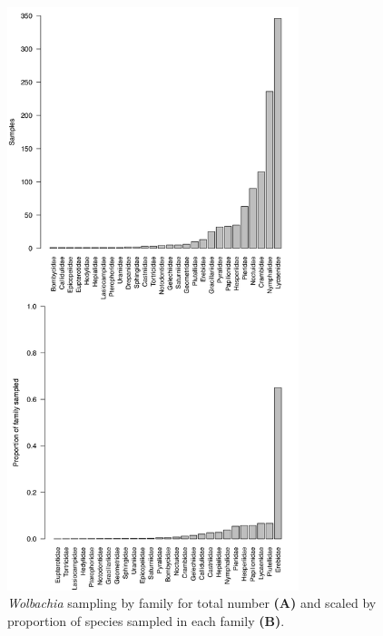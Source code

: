 \documentclass{frontiersSCNS}
\begin{document}
\begin{figure}[h!]
\begin{center}
\includegraphics[width=85mm]{Fams_n_Props.pdf}%
\end{center}
\caption{\textit{Wolbachia} sampling by family for total number \textbf{(A)} and scaled by proportion of species sampled in each family \textbf{(B)}.}
\label{histograms}
\end{figure}

\newpage
\end{document}

